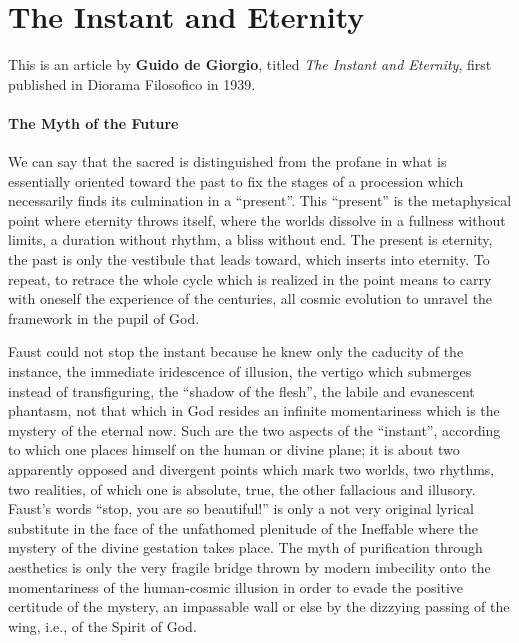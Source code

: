 \section{The Instant and Eternity}

\begin{quotex}
This is an article by \textbf{Guido de Giorgio}, titled \textit{The Instant and Eternity}, first published in Diorama Filosofico in 1939.
\end{quotex}

\paragraph{The Myth of the Future}
We can say that the sacred is distinguished from the profane in what is essentially oriented toward the past to fix the stages of a procession which necessarily finds its culmination in a ``present''. This ``present'' is the metaphysical point where eternity throws itself, where the worlds dissolve in a fullness without limits, a duration without rhythm, a bliss without end. The present is eternity, the past is only the vestibule that leads toward, which inserts into eternity. To repeat, to retrace the whole cycle which is realized in the point means to carry with oneself the experience of the centuries, all cosmic evolution to unravel the framework in the pupil of God.

Faust could not stop the instant because he knew only the caducity of the instance, the immediate iridescence of illusion, the vertigo which submerges instead of transfiguring, the ``shadow of the flesh'', the labile and evanescent phantasm, not that which in God resides an infinite momentariness which is the mystery of the eternal now. Such are the two aspects of the ``instant'', according to which one places himself on the human or divine plane; it is about two apparently opposed and divergent points which mark two worlds, two rhythms, two realities, of which one is absolute, true, the other fallacious and illusory. Faust's words ``stop, you are so beautiful!'' is only a not very original lyrical substitute in the face of the unfathomed plenitude of the Ineffable where the mystery of the divine gestation takes place. The myth of purification through aesthetics is only the very fragile bridge thrown by modern imbecility onto the momentariness of the human-cosmic illusion in order to evade the positive certitude of the mystery, an impassable wall or else by the dizzying passing of the wing, i.e., of the Spirit of God.

